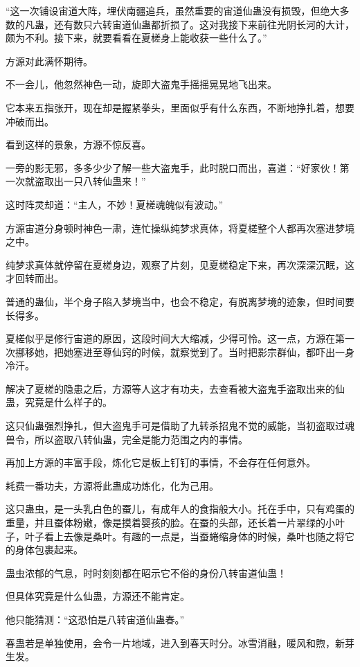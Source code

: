 \begin{this_body}
“这一次铺设宙道大阵，埋伏南疆追兵，虽然重要的宙道仙蛊没有损毁，但绝大多数的凡蛊，还有数只六转宙道仙蛊都折损了。这对我接下来前往光阴长河的大计，颇为不利。接下来，就要看看在夏槎身上能收获一些什么了。”

方源对此满怀期待。

不一会儿，他忽然神色一动，旋即大盗鬼手摇摇晃晃地飞出来。

它本来五指张开，现在却是握紧拳头，里面似乎有什么东西，不断地挣扎着，想要冲破而出。

看到这样的景象，方源不惊反喜。

一旁的影无邪，多多少少了解一些大盗鬼手，此时脱口而出，喜道：“好家伙！第一次就盗取出一只八转仙蛊来！”

这时阵灵却道：“主人，不妙！夏槎魂魄似有波动。”

方源宙道分身顿时神色一肃，连忙操纵纯梦求真体，将夏槎整个人都再次塞进梦境之中。

纯梦求真体就停留在夏槎身边，观察了片刻，见夏槎稳定下来，再次深深沉眠，这才回转而出。

普通的蛊仙，半个身子陷入梦境当中，也会不稳定，有脱离梦境的迹象，但时间要长得多。

夏槎似乎是修行宙道的原因，这段时间大大缩减，少得可怜。这一点，方源在第一次挪移她，把她塞进至尊仙窍的时候，就察觉到了。当时把影宗群仙，都吓出一身冷汗。

解决了夏槎的隐患之后，方源等人这才有功夫，去查看被大盗鬼手盗取出来的仙蛊，究竟是什么样子的。

这只仙蛊强烈挣扎，但大盗鬼手可是借助了九转杀招鬼不觉的威能，当初盗取过魂兽令，所以盗取八转仙蛊，完全是能力范围之内的事情。

再加上方源的丰富手段，炼化它是板上钉钉的事情，不会存在任何意外。

耗费一番功夫，方源将此蛊成功炼化，化为己用。

这只蛊虫，是一头乳白色的蚕儿，有成年人的食指般大小。托在手中，只有鸡蛋的重量，并且蚕体粉嫩，像是摸着婴孩的脸。在蚕的头部，还长着一片翠绿的小叶子，叶子看上去像是桑叶。有趣的一点是，当蚕蜷缩身体的时候，桑叶也随之将它的身体包裹起来。

蛊虫浓郁的气息，时时刻刻都在昭示它不俗的身份八转宙道仙蛊！

但具体究竟是什么仙蛊，方源还不能肯定。

他只能猜测：“这恐怕是八转宙道仙蛊春。”

春蛊若是单独使用，会令一片地域，进入到春天时分。冰雪消融，暖风和煦，新芽生发。


\end{this_body}
